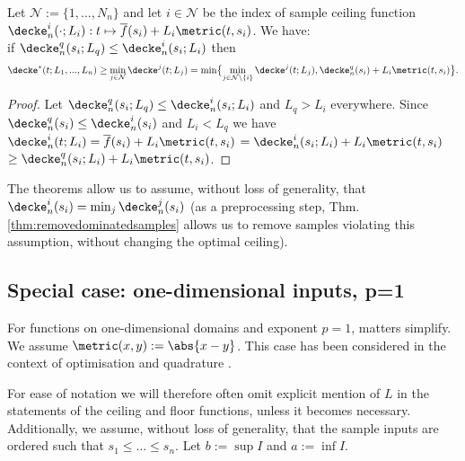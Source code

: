 \begin{thm}
\label{thm:dominatedsamples_greatLIPconst}
Let $\mathcal N := \{1,...,N_n\}$ and let $i \in \mathcal N$ be the index of sample ceiling function $\decke_n^i(\cdot;L_i): t \mapsto \overline f(s_i) + L_i \metric(t,s_i) $. We have: \\if $\decke_n^q(s_i;L_q) \leq \decke_n^i(s_i;L_i)$ then 
\[  \decke^*(t;L_1,...,L_n) \geq \min_{j \in \mathcal N} \decke^j(t;L_j) =  \min \bigl\{ \min_{j \in \mathcal N\backslash \{i\}} \decke^j(t;L_j), \decke_n^q(s_i) + L_i \metric(t,s_i) \bigr\}.\]

\begin{proof} Let $\decke_n^q(s_i;L_q) \leq \decke_n^i(s_i;L_i)$ and $L_q > L_i $ everywhere. Since $\decke_n^q(s_i) \leq \decke_n^i(s_i)$ and $L_i < L_q$ we have $\decke_n^i(t;L_i) = \overline f(s_i) + L_i \metric(t,s_i) $
$= \decke_n^i(s_i;L_i) + L_i \metric(t,s_i)$
$\geq \decke_n^q(s_i;L_i) + L_i \metric(t,s_i)$.

\end{proof}

\end{thm}

\begin{rem} \label{rem:assumptionsceil}
The theorems allow us to assume, without loss of generality, that $\decke_n^i(s_i) = \min_j \decke_n^j(s_i)$ (as a preprocessing step, Thm. 
\ref{thm:removedominatedsamples} allows us to remove samples violating this assumption, without changing the optimal ceiling). 
\end{rem}



\subsection{Special case: one-dimensional inputs, p=1}
For functions on one-dimensional domains and exponent $p=1$, matters simplify. We assume $\metric(x,y) := \abs{x-y}$. This case has been considered in the context of optimisation \cite{Shubert:72} and quadrature \cite{Baran2008}.


For ease of notation we will therefore often omit explicit mention of $L$ in the statements of the ceiling and floor functions, unless it becomes necessary. Additionally, we assume, without loss of generality, that the sample inputs are ordered such that $s_1\leq \ldots \leq s_n$. Let $b := \sup I $ and $a := \inf I$.



